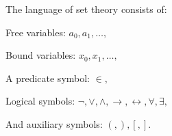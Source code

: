 The language of set theory consists of:

Free variables: $a_0, a_1, \ldots,$

Bound variables: $x_0, x_1, \ldots,$

A predicate symbol: $\in,$

Logical symbols: $\neg, \lor, \land, \rightarrow, \leftrightarrow, \forall, \exists,$

And auxiliary symbols: $(, ), [, ].$

